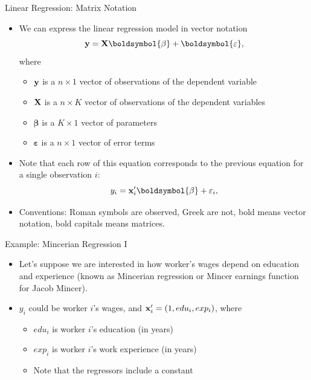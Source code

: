 \documentclass[aspectratio=169,11pt]{beamer}
\begin{document}
\begin{frame}{Linear Regression: Matrix Notation}
	\begin{itemize}
	\item We can express the linear regression model in vector notation
	\begin{equation*}
		{\bf y}= {\bf X} \boldsymbol{\beta} + \boldsymbol{\varepsilon},
	\end{equation*}
	where 
	\begin{itemize}
		\item ${\bf y}$ is a $n\times 1$ vector of observations of the dependent variable
		\item ${\bf X}$ is a $n\times K$ vector of observations of the dependent variables
		\item $\boldsymbol{\beta} $ is a $K\times 1$ vector of parameters
		\item $\boldsymbol{\varepsilon}$ is a $n\times 1$ vector of error terms
	\end{itemize}

	\item Note that each row of this equation corresponds to the previous equation for
	a single observation $i$:\[
	y_i = {\bf x}_{i}'\boldsymbol{\beta} + \varepsilon_i,
	\]

	\item Conventions: Roman symbols are observed, Greek are not, bold means vector notation, 
	bold capitals means matrices.
\end{itemize}
\end{frame}

\begin{frame}{Example: Mincerian Regression I}
\begin{itemize}
	\item Let's suppose we are interested in how worker's wages depend on education and experience
	(known as Mincerian regression or Mincer earnings function for Jacob Mincer).

	\medskip
	\item $y_{i}$ could be worker $i$'s wages, and ${\bf x}_i' = \left(1,edu_i,exp_i \right)$, 
	where 
	\begin{itemize}
		\item $edu_i$ is worker $i$'s education (in years)
		\item $exp_i$ is worker $i$'s work experience (in years)
		\item Note that the regressors include a constant 
	\end{itemize}
\end{itemize}
\end{frame}
\end{document}
